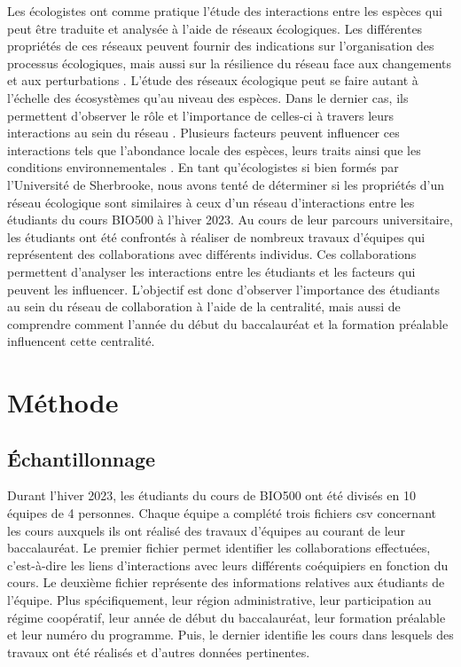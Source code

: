 \documentclass[preprint, 3p,
authoryear]{elsarticle} %
\begin{document}
Les écologistes ont comme pratique l'étude des interactions entre les
espèces qui peut être traduite et analysée à l'aide de réseaux
écologiques. Les différentes propriétés de ces réseaux peuvent fournir
des indications sur l'organisation des processus écologiques, mais aussi
sur la résilience du réseau face aux changements et aux perturbations
\citep{delmas2019analysing}. L'étude des réseaux écologique peut se
faire autant à l'échelle des écosystèmes qu'au niveau des espèces. Dans
le dernier cas, ils permettent d'observer le rôle et l'importance de
celles-ci à travers leurs interactions au sein du réseau
\citep{delmas2019analysing}. Plusieurs facteurs peuvent influencer ces
interactions tels que l'abondance locale des espèces, leurs traits ainsi
que les conditions environnementales \citep{delmas2019analysing}. En
tant qu'écologistes si bien formés par l'Université de Sherbrooke, nous
avons tenté de déterminer si les propriétés d'un réseau écologique sont
similaires à ceux d'un réseau d'interactions entre les étudiants du
cours BIO500 à l'hiver 2023. Au cours de leur parcours universitaire,
les étudiants ont été confrontés à réaliser de nombreux travaux
d'équipes qui représentent des collaborations avec différents individus.
Ces collaborations permettent d'analyser les interactions entre les
étudiants et les facteurs qui peuvent les influencer. L'objectif est
donc d'observer l'importance des étudiants au sein du réseau de
collaboration à l'aide de la centralité, mais aussi de comprendre
comment l'année du début du baccalauréat et la formation préalable
influencent cette centralité.

\hypertarget{muxe9thode}{%
\section{Méthode}\label{muxe9thode}}

\hypertarget{uxe9chantillonnage}{%
\subsection{Échantillonnage}\label{uxe9chantillonnage}}

Durant l'hiver 2023, les étudiants du cours de BIO500 ont été divisés en
10 équipes de 4 personnes. Chaque équipe a complété trois fichiers csv
concernant les cours auxquels ils ont réalisé des travaux d'équipes au
courant de leur baccalauréat. Le premier fichier permet identifier les
collaborations effectuées, c'est-à-dire les liens d'interactions avec
leurs différents coéquipiers en fonction du cours. Le deuxième fichier
représente des informations relatives aux étudiants de l'équipe. Plus
spécifiquement, leur région administrative, leur participation au régime
coopératif, leur année de début du baccalauréat, leur formation
préalable et leur numéro du programme. Puis, le dernier identifie les
cours dans lesquels des travaux ont été réalisés et d'autres données
pertinentes.
\end{document}
